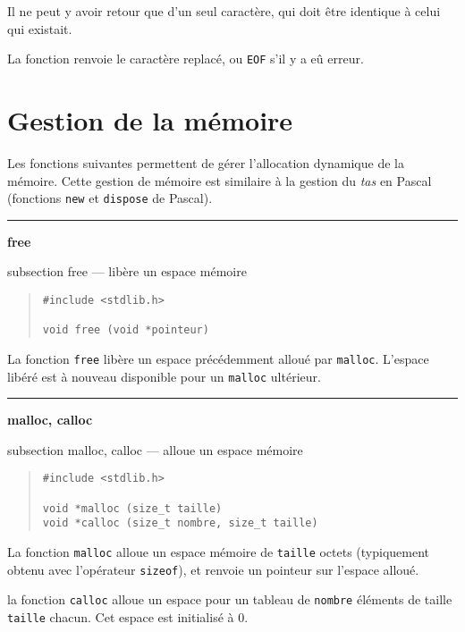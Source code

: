 \documentclass [twoside] {report}
\newcommand {\primitive} [1]
    {
	\phantomsection
	{\large \bf #1}
	\addcontentsline {toc} {subsection} {#1}
    }
\newcommand {\separation}
    {
	\vspace {5mm}
	\nopagebreak
	\hrule
    }
\begin{document}
Il ne peut y avoir retour que d'un seul caractère, qui doit
être identique à celui qui existait.

La fonction renvoie le caractère replacé, ou {\tt EOF} s'il y
a eû erreur.




\section {Gestion de la mémoire}


Les fonctions suivantes permettent de gérer l'allocation
dynamique de la mémoire. Cette gestion de mémoire est
similaire à la gestion du {\em tas} en Pascal (fonctions {\tt new}
et {\tt dispose} de Pascal).




\separation
\primitive {free} --- libère un espace mémoire

\begin {quote}
\begin {verbatim}
#include <stdlib.h>

void free (void *pointeur)
\end{verbatim}
\end {quote}

La fonction {\tt free} libère un espace précédemment alloué
par {\tt malloc}. L'espace libéré est à nouveau disponible pour
un {\tt malloc} ultérieur.



\separation
\primitive {malloc, calloc} --- alloue un espace mémoire

\begin {quote}
\begin {verbatim}
#include <stdlib.h>

void *malloc (size_t taille)
void *calloc (size_t nombre, size_t taille)
\end{verbatim}
\end {quote}

La fonction {\tt malloc} alloue un espace mémoire de
{\tt taille} octets (typiquement obtenu avec l'opérateur
{\tt sizeof}), et renvoie un pointeur sur l'espace alloué.

la fonction {\tt calloc} alloue un espace pour un tableau de
{\tt nombre} éléments de taille {\tt taille} chacun. Cet espace
est initialisé à 0.
\end{document}
